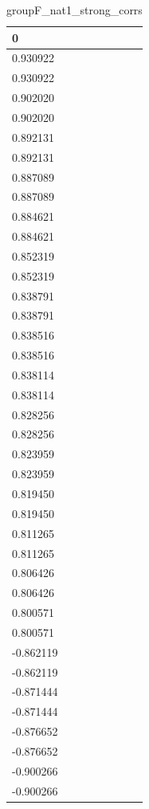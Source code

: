 \begin{table}
\caption{groupF_nat1_strong_corrs}
\label{tab:groupF_nat1_strong_corrs}
\begin{tabular}{lcr}
\toprule
0 \\
\midrule
0.930922 \\
0.930922 \\
0.902020 \\
0.902020 \\
0.892131 \\
0.892131 \\
0.887089 \\
0.887089 \\
0.884621 \\
0.884621 \\
0.852319 \\
0.852319 \\
0.838791 \\
0.838791 \\
0.838516 \\
0.838516 \\
0.838114 \\
0.838114 \\
0.828256 \\
0.828256 \\
0.823959 \\
0.823959 \\
0.819450 \\
0.819450 \\
0.811265 \\
0.811265 \\
0.806426 \\
0.806426 \\
0.800571 \\
0.800571 \\
-0.862119 \\
-0.862119 \\
-0.871444 \\
-0.871444 \\
-0.876652 \\
-0.876652 \\
-0.900266 \\
-0.900266 \\
\bottomrule
\end{tabular}
\end{table}

